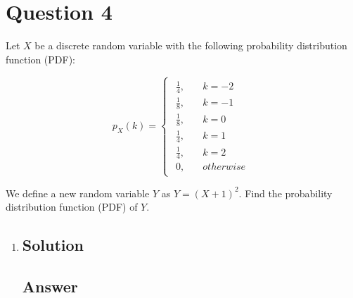 \documentclass[12pt]{article}
\begin{document}
	
	\section*{Question 4}
	
	\noindent Let $X$ be a discrete random variable with the following probability distribution function (PDF):
	
	\[
		p_X(k) =
			\begin{cases}
				\begin{aligned}
					\frac{1}{4}, &\quad k = -2\\
					\frac{1}{8}, &\quad k = -1\\
					\frac{1}{8}, &\quad k = 0\\
					\frac{1}{4}, &\quad k = 1\\
					\frac{1}{4}, &\quad k = 2\\
					0, &\quad otherwise
				\end{aligned}
			\end{cases}
	\]
	
	\noindent We define a new random variable $Y$ as $Y = (X + 1)^2$. Find the probability distribution function (PDF) of $Y$.
	
	\bigskip
	
	\begin{enumerate}[label={},leftmargin=0in]\item
		\subsection*{Solution}
		
		\subsection*{Answer}
		
			\[\boxed{}\]
	\end{enumerate}
	
\end{document}
